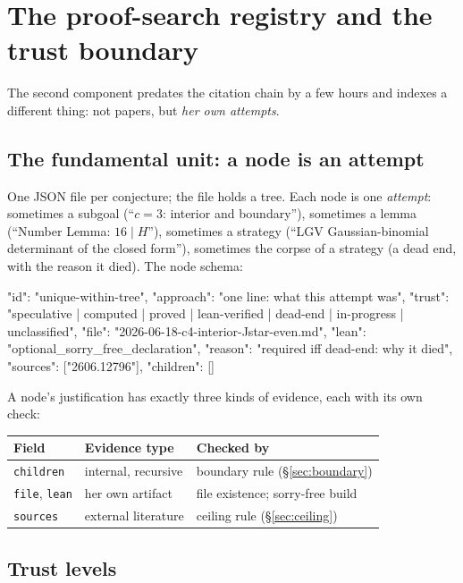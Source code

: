 \documentclass[11pt,a4paper]{article}
\begin{document}
\section{The proof-search registry and the trust boundary}
\label{sec:registry}

The second component predates the citation chain by a few hours and indexes
a different thing: not papers, but \emph{her own attempts}.

\subsection{The fundamental unit: a node is an attempt}

One JSON file per conjecture; the file holds a tree. Each node is one
\emph{attempt}: sometimes a subgoal (``$c=3$: interior and boundary''),
sometimes a lemma (``Number Lemma: $16 \mid H$''), sometimes a strategy
(``LGV Gaussian-binomial determinant of the closed form''), sometimes the
corpse of a strategy (a dead end, with the reason it died). The node schema:

\begin{code}
{ "id": "unique-within-tree",
  "approach": "one line: what this attempt was",
  "trust": "speculative | computed | proved | lean-verified
            | dead-end | in-progress | unclassified",
  "file": "2026-06-18-c4-interior-Jstar-even.md",
  "lean": "optional_sorry_free_declaration",
  "reason": "required iff dead-end: why it died",
  "sources": ["2606.12796"],
  "children": [] }
\end{code}

A node's justification has exactly three kinds of evidence, each with its
own check:

\begin{center}
\begin{tabular}{@{}lll@{}}
\toprule
Field & Evidence type & Checked by \\
\midrule
\texttt{children} & internal, recursive & boundary rule (\S\ref{sec:boundary}) \\
\texttt{file}, \texttt{lean} & her own artifact & file existence; sorry-free build \\
\texttt{sources} & external literature & ceiling rule (\S\ref{sec:ceiling}) \\
\bottomrule
\end{tabular}
\end{center}

\subsection{Trust levels}
\end{document}

